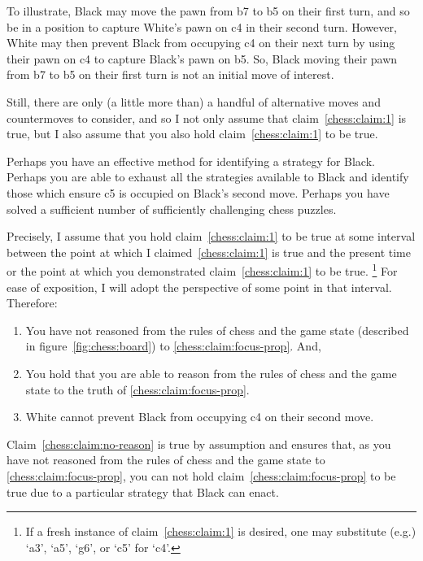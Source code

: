 \documentclass[10pt]{article}
\begin{document}
To illustrate, Black may move the pawn from b7 to b5 on their first turn, and so be in a position to capture White's pawn on c4 in their second turn.
However, White may then prevent Black from occupying c4 on their next turn by using their pawn on c4 to capture Black's pawn on b5.
So, Black moving their pawn from b7 to b5 on their first turn is not an initial move of interest.

Still, there are only (a little more than) a handful of alternative moves and countermoves to consider, and so I not only assume that claim~\ref{chess:claim:1} is true, but I also assume that you also hold claim~\ref{chess:claim:1} to be true.

\begin{note}
  Perhaps you have an effective method for identifying a strategy for Black.
  Perhaps you are able to exhaust all the strategies available to Black and identify those which ensure c5 is occupied on Black's second move.
  Perhaps you have solved a sufficient number of sufficiently challenging chess puzzles.
\end{note}

Precisely, I assume that you hold claim~\ref{chess:claim:1} to be true at some interval between the point at which I claimed~\ref{chess:claim:1} is true and the present time or the point at which you demonstrated claim~\ref{chess:claim:1} to be true.\nolinebreak
\footnote{
  If a fresh instance of claim~\ref{chess:claim:1} is desired, one may substitute (e.g.) `a3', `a5', `g6', or `c5' for `c4'.
}
For ease of exposition, I will adopt the perspective of some point in that interval.
Therefore:
\begin{enumerate}[resume]
\item\label{chess:claim:no-reason} You have not reasoned from the rules of chess and the game state (described in figure~\ref{fig:chess:board}) to \ref{chess:claim:focus-prop}. And,
\item\label{chess:claim:able-reason} You hold that you are able to reason from the rules of chess and the game state to the truth of \ref{chess:claim:focus-prop}.
\item\label{chess:claim:focus-prop} White cannot prevent Black from occupying c4 on their second move.
\end{enumerate}

Claim~\ref{chess:claim:no-reason} is true by assumption and ensures that, as you have not reasoned from the rules of chess and the game state to \ref{chess:claim:focus-prop}, you can not hold claim~\ref{chess:claim:focus-prop} to be true due to a particular strategy that Black can enact.
\end{document}
